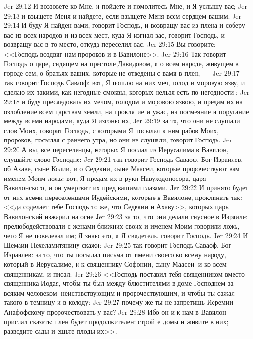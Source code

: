 \vs Jer 29:12 И воззовете ко Мне, и пойдете и помолитесь Мне, и Я услышу вас;
\vs Jer 29:13 и взыщете Меня и найдете, если взыщете Меня всем сердцем вашим.
\vs Jer 29:14 И буду Я найден вами, говорит Господь, и возвращу вас из плена и соберу вас из всех народов и из всех мест, куда Я изгнал вас, говорит Господь, и возвращу вас в то место, откуда переселил вас.
\vs Jer 29:15 Вы говорите: <<Господь воздвиг нам пророков и в Вавилоне>>.
\rsbpar\vs Jer 29:16 Так говорит Господь о царе, сидящем на престоле Давидовом, и о всем народе, живущем в городе сем, о братьях ваших, которые не отведены с вами в плен,~---
\vs Jer 29:17 так говорит  Господь Саваоф: вот, Я пошлю на них меч, голод и моровую язву, и сделаю их такими, как негодные смоквы, которых нельзя есть по негодности ;
\vs Jer 29:18 и буду преследовать их мечом, голодом и моровою язвою, и предам их на озлобление всем царствам земли, на проклятие и ужас, на посмеяние и поругание между всеми народами, куда Я изгоню их,
\vs Jer 29:19 за то, что они не слушали слов Моих, говорит Господь, с которыми Я посылал к ним рабов Моих, пророков, посылал с раннего утра, но они не слушали, говорит Господь.
\rsbpar\vs Jer 29:20 А вы, все переселенцы, которых Я послал из Иерусалима в Вавилон, слушайте слово Господне:
\vs Jer 29:21 так говорит Господь Саваоф, Бог Израилев, об Ахаве, сыне Колии, и о Седекии, сыне Маасеи, которые пророчествуют вам именем Моим ложь: вот, Я предам их в руки Навуходоносора, царя Вавилонского, и он умертвит их пред вашими глазами.
\vs Jer 29:22 И принято будет от них всеми переселенцами Иудейскими, которые в Вавилоне, проклинать так: <<да соделает тебе Господь то же, что Седекии и Ахаву>>, которых царь Вавилонский изжарил на огне
\vs Jer 29:23 за то, что они делали гнусное в Израиле: прелюбодействовали с женами ближних своих и именем Моим говорили ложь, чего Я не повелевал им; Я знаю это, и Я свидетель, говорит Господь.
\vs Jer 29:24 И Шемаии Нехеламитянину скажи:
\vs Jer 29:25 так говорит Господь Саваоф, Бог Израилев: за то, что ты посылал письма от имени своего ко всему народу, который в Иерусалиме, и к священнику Софонии, сыну Маасеи, и ко всем священникам, и писал:
\vs Jer 29:26 <<Господь поставил тебя священником вместо священника Иодая, чтобы ты был между блюстителями в доме Господнем за всяким человеком, неистовствующим и пророчествующим, и чтобы ты сажал такого в темницу и в колоду:
\vs Jer 29:27 почему же ты не запретишь Иеремии Анафофскому пророчествовать у вас?
\vs Jer 29:28 Ибо он и к нам в Вавилон прислал сказать: плен будет продолжителен: стройте домы и живите в них; разводите сады и ешьте плоды их>>.
